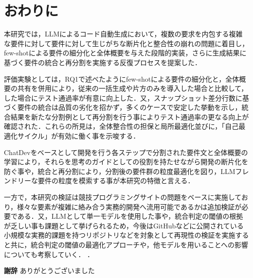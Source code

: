 \documentclass[submit,techrep,noauthor]{ipsj}
\begin{document}
\section{おわりに}
\label{sec:conclusion}
本研究では，LLMによるコード自動生成において，複数の要求を内包する複雑な要件に対して要件に対して生じがちな断片化と整合性の崩れの問題に着目し，few-shotによる要件の細分化と全体概要を与えた段階的実装，さらに生成結果に基づく要件の統合と再分割を実施する反復プロセスを提案した．

評価実験としては，RQ1で述べたようにfew-shotによる要件の細分化と，全体概要の共有を併用により，従来の一括生成や片方のみを導入した場合と比較して，した場合にテスト通過率が有意に向上した．又，スナップショット差分行数に基づく要件の統合は品質の劣化を招かず，多くのケースで安定した挙動を示し，統合結果を新たな分割例として再分割を行う事によりテスト通過率の更なる向上が確認された．これらの所見は，全体整合性の担保と局所最適化並びに，「自己最適化サイクル」が有効に働く事を示唆する．

ChatDevをベースとして開発を行う各ステップで分割された要件文と全体概要の学習により，それらを思考のガイドとしての役割を持たせながら開発の断片化を防ぐ事や，統合と再分割により，分割後の要件群の粒度最適化を図り，LLMフレンドリーな要件の粒度を模索する事が本研究の特徴と言える．

一方で，本研究の検証は競技プログラミングサイトの問題をベースに実施しており，様々な要素が複雑に絡み合う実務的開発へ流用可能であるかは追加検証が必要である．又，LLMとして単一モデルを使用した事や，統合判定の閾値の根拠が乏しい事も課題として挙げられるため，今後はGitHubなどに公開されている小規模な実務的課題を持つリポジトリなどを対象として再現性の検証を実施すると共に，統合判定の閾値の最適化アプローチや，他モデルを用いることへの影響についても考察していく．
．

\textbf{謝辞} ありがとうございました



\end{document}
